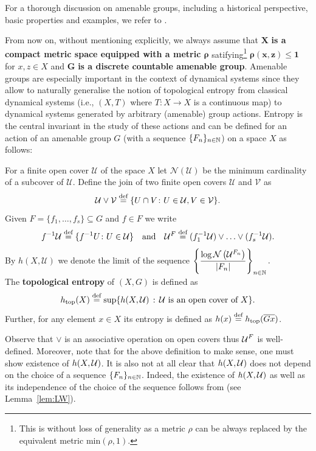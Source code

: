 \noindent
For a thorough discussion on amenable groups, including a historical perspective, basic properties and examples, we refer to \cite{CC10}. 

From now on, without mentioning explicitly, we always assume that $\bm{X}$ {\bf is a compact metric space equipped with a metric $\bm{\rho}$} satifying\footnote{This is without loss of generality as a metric $\rho$ can be always replaced by the equivalent metric $\mathrm{min}(\rho,1)$.} $\bm{\rho(x,z)\leq 1}$ for $x,z\in X$ and $\bm{G}$ {\bf is a discrete countable amenable group}.
%
Amenable groups are especially important in the context of dynamical systems since they allow to naturally generalise the notion of topological entropy from classical dynamical systems (i.e., $(X,T)$ where  $T\colon X\to X$ is a continuous map) to dynamical systems generated by arbitrary (amenable) group actions. Entropy is the central invariant in the study of these actions and can be defined for an action of an amenable group $G$ (with a \Folner sequence $\{F_n\}_{n\in \mathbb{N}}$) on a space $X$ as follows:
%
\begin{defn}\label{def:entropy}
For a finite open cover $\mathcal U$ of the space $X$ let $\mathcal N(\mathcal U)$ be the minimum cardinality of a subcover of $\mathcal U$. Define the join of two finite open covers $\mathcal U$ and $\mathcal V$ as
\[
\mathcal U\vee\mathcal V\stackrel{\textup{def}}{=}\{U\cap V\colon U\in\mathcal U, V \in\mathcal V\}.
\]
Given $F=\{f_1,\ldots,f_s\}\subseteq G$ and $f\in F$ we write 
\[ f^{-1}\mathcal U\stackrel{\textup{def}}{=} \{f^{-1}U\colon U\in \mathcal U\} \quad\text{and} \quad\mathcal U^F \stackrel{\textup{def}}{=} (f_1^{-1}\mathcal{U})\vee\ldots\vee (f_s^{-1}\mathcal{U}).\] By $h(X, \mathcal U)$ we denote the limit of the sequence 
$\displaystyle
\left\{\frac{\log\mathcal N\left(\mathcal U^{F_n}\right)}{|F_n|}\right\}_{n\in\mathbb{N}}.
$
\\
The {\bf topological entropy} of $(X,G)$ is defined as 
\[
h_\mathrm{top}(X)\stackrel{\textup{def}}{=}\sup\{h(X,\mathcal U)\,:\,\mathcal U\text{ is an open cover of }X\}.
\]
Further, for any element $x\in X$ its entropy is defined as  $h(x)\stackrel{\textup{def}}{=}h_\mathrm{top}(\overline{Gx})$.
\end{defn}

\noindent
Observe that $\vee$ is an associative operation on open covers thus $\operatorname{\mathcal{U}}^F$ is well-defined.
%
Moreover, note that for the above definition to make sense, one must show existence of $h(X, \operatorname{\mathcal{U}})$. It is also not at all clear that $h(X,\operatorname{\mathcal{U}})$ does not depend on the choice of a \Folner sequence $\{F_n\}_{n\in\mathbb{N}}$. Indeed, the existence of $h(X,\operatorname{\mathcal{U}})$ as well as its independence of the choice of the \Folner sequence follows from \cite[Theorem 6.1]{LW00} (see Lemma~\ref{lem:LW}).





